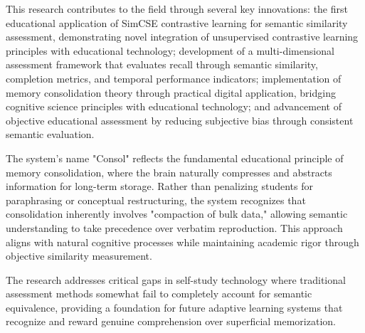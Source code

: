 {\color{maroon}
This research contributes to the field through several key innovations: the first educational application of SimCSE contrastive learning for semantic similarity assessment, demonstrating novel integration of unsupervised contrastive learning principles with educational technology; development of a multi-dimensional assessment framework that evaluates recall through semantic similarity, completion metrics, and temporal performance indicators; implementation of memory consolidation theory through practical digital application, bridging cognitive science principles with educational technology; and advancement of objective educational assessment by reducing subjective bias through consistent semantic evaluation.

The system's name "Consol" reflects the fundamental educational principle of memory consolidation, where the brain naturally compresses and abstracts information for long-term storage. Rather than penalizing students for paraphrasing or conceptual restructuring, the system recognizes that consolidation inherently involves "compaction of bulk data," allowing semantic understanding to take precedence over verbatim reproduction. This approach aligns with natural cognitive processes while maintaining academic rigor through objective similarity measurement.

The research addresses critical gaps in self-study technology where traditional assessment methods somewhat fail to completely account for semantic equivalence, providing a foundation for future adaptive learning systems that recognize and reward genuine comprehension over superficial memorization. 
}

